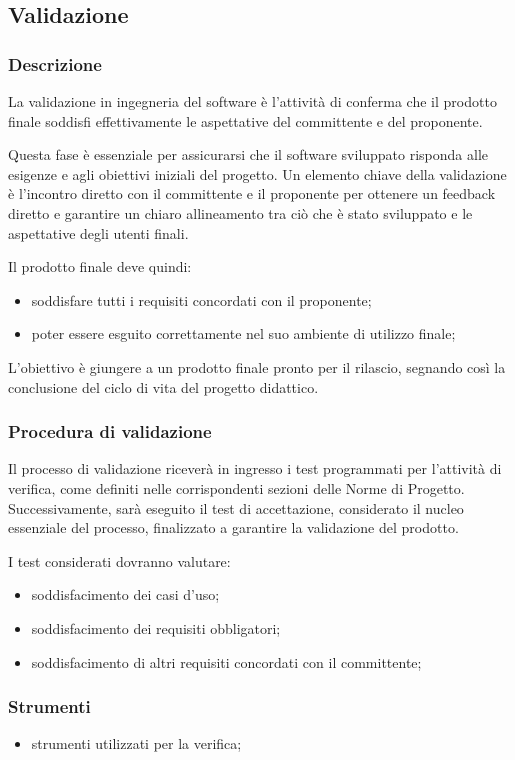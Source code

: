 \subsection{Validazione}

\subsubsection{Descrizione}
La validazione in ingegneria del software è l'attività di conferma che il prodotto finale soddisfi effettivamente le aspettative del committente e del proponente.

Questa fase è essenziale per assicurarsi che il software sviluppato risponda alle esigenze e agli obiettivi iniziali del progetto.
Un elemento chiave della validazione è l'incontro diretto con il committente e il proponente per ottenere un feedback diretto e garantire un chiaro allineamento tra ciò che è stato sviluppato e le aspettative degli utenti finali.

Il prodotto finale deve quindi:
\begin{itemize}
    \item 
        soddisfare tutti i requisiti concordati con il proponente;
    \item 
        poter essere esguito correttamente nel suo ambiente di utilizzo finale;
\end{itemize}

L'obiettivo è giungere a un prodotto finale pronto per il rilascio, segnando così la conclusione del ciclo di vita del progetto didattico.

\subsubsection{Procedura di validazione}
Il processo di validazione riceverà in ingresso i test programmati per l'attività di verifica, come definiti nelle corrispondenti sezioni delle Norme di Progetto. Successivamente, sarà eseguito il test di accettazione, considerato il nucleo essenziale del processo, finalizzato a garantire la validazione del prodotto.

I test considerati dovranno valutare:
\begin{itemize}
    \item 
        soddisfacimento dei casi d’uso;
    \item 
        soddisfacimento dei requisiti obbligatori;
    \item 
        soddisfacimento di altri requisiti concordati con il committente;
\end{itemize}

\subsubsection{Strumenti}
\begin{itemize}
    \item 
        strumenti utilizzati per la verifica;
\end{itemize}
